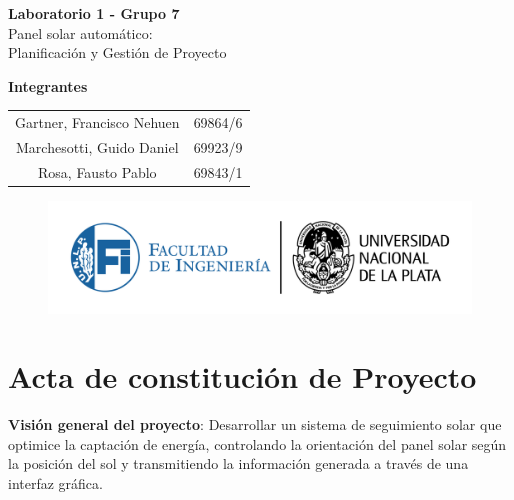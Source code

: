\documentclass[a4paper,12pt]{article}
\begin{document}
\begin{titlepage}
    \begin{center}
        \vspace*{3cm}
        
        {\Huge \textbf{Laboratorio 1 - Grupo 7}}\\[1cm]
        {\LARGE Panel solar automático:\\ [0.5cm]Planificación y Gestión de Proyecto}\\[2cm]
        
        \vfill
        
        {\Large \textbf{Integrantes }}\\[.5cm]
        \large
        \begin{tabular}{c c}
            Gartner, Francisco Nehuen & 69864/6 \\
            Marchesotti, Guido Daniel & 69923/9 \\
            Rosa, Fausto Pablo & 69843/1 \\
        \end{tabular}
        
        \vspace{1cm}
        
        \begin{figure}[b]
            \centering
            \includegraphics[width=1\linewidth]{LOGOSFI-UNLP-color-01.png}
        \end{figure}
        
    \end{center}
\end{titlepage}


\section{Acta de constitución de Proyecto}

\hspace{0.4cm}\textbf{ Visión general del proyecto}: 
Desarrollar un sistema de seguimiento solar que optimice la captación de energía, controlando la orientación del panel solar según la posición del sol y transmitiendo la información generada a través de una interfaz gráfica.
\end{document}
